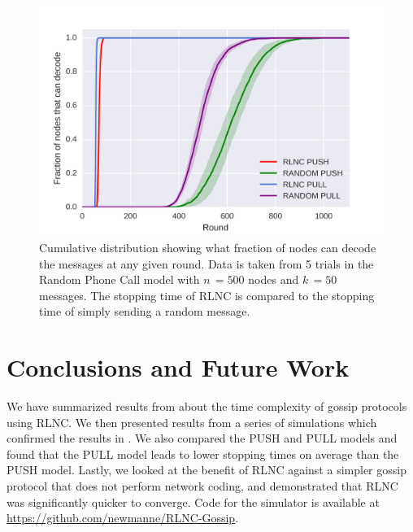 \documentclass{article} %
\def\numNodes{\textit{n}\,}
\def\numMessages{\textit{k}\,}
\begin{document}
\begin{figure}
\centering
\includegraphics[width=\linewidth]{figures/ecdf.png}
\caption{Cumulative distribution showing what fraction of nodes can decode the messages at any given round. Data is taken from 5 trials in the Random Phone Call model with $\numNodes=500$ nodes and $\numMessages=50$ messages. The stopping time of RLNC is compared to the stopping time of simply sending a random message.}
\label{fig:rlnc-ecdf}
\end{figure} 

\section{Conclusions and Future Work}
We have summarized results from \cite{haeupler2011analyzing} about the time complexity of gossip protocols using RLNC. We then presented results from a series of simulations which confirmed the results in \cite{haeupler2011analyzing}. We also compared the PUSH and PULL models and found that the PULL model leads to lower stopping times on average than the PUSH model. Lastly, we looked at the benefit of RLNC against a simpler gossip protocol that does not perform network coding, and demonstrated that RLNC was significantly quicker to converge. Code for the simulator is available at \url{https://github.com/newmanne/RLNC-Gossip}.

\nocite{*}


\end{document}
